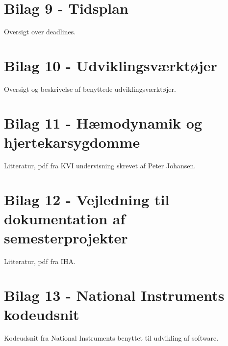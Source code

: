 \section{Bilag 9 - Tidsplan}
Oversigt over deadlines.

\section{Bilag 10 - Udviklingsværktøjer}
Oversigt og beskrivelse af benyttede udviklingsværktøjer.

\section{Bilag 11 - Hæmodynamik og hjertekarsygdomme}
Litteratur, pdf fra KVI undervisning skrevet af Peter Johansen.

\section{Bilag 12 - Vejledning til dokumentation af semesterprojekter}
Litteratur, pdf fra IHA.

\section{Bilag 13 - National Instruments kodeudsnit}
Kodeudsnit fra National Instruments benyttet til udvikling af software.

